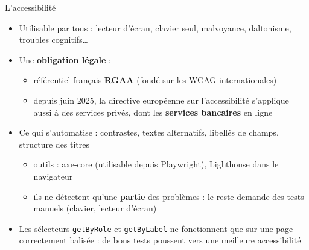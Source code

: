 \documentclass[aspectratio=169,10pt]{beamer}
\begin{document}
\begin{frame}{L'accessibilité}
  \begin{itemize}
    \item Utilisable par tous : lecteur d'écran, clavier seul, malvoyance, daltonisme, troubles cognitifs\ldots
    \item Une \textbf{obligation légale} :
      \begin{itemize}
        \item référentiel français \textbf{RGAA} (fondé sur les WCAG internationales)
        \item depuis juin 2025, la directive européenne sur l'accessibilité s'applique aussi à des services privés, dont les \textbf{services bancaires} en ligne
      \end{itemize}
    \item Ce qui s'automatise : contrastes, textes alternatifs, libellés de champs, structure des titres
      \begin{itemize}
        \item outils : axe-core (utilisable depuis Playwright), Lighthouse dans le navigateur
        \item ils ne détectent qu'une \textbf{partie} des problèmes : le reste demande des tests manuels (clavier, lecteur d'écran)
      \end{itemize}
    \item Les sélecteurs \texttt{getByRole} et \texttt{getByLabel} ne fonctionnent que sur une page correctement balisée : de bons tests poussent vers une meilleure accessibilité
  \end{itemize}
\end{frame}
\end{document}
